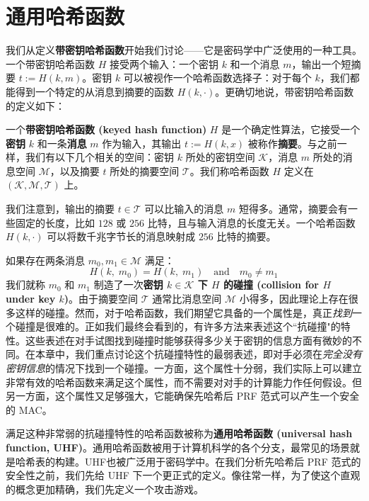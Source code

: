 \section{通用哈希函数}

我们从定义\textbf{带密钥哈希函数}开始我们讨论——它是密码学中广泛使用的一种工具。一个带密钥哈希函数 $H$ 接受两个输入：一个密钥 $k$ 和一个消息 $m$，输出一个短摘要 $t:=H(k,m)$。密钥 $k$ 可以被视作一个哈希函数选择子：对于每个 $k$，我们都能得到一个特定的从消息到摘要的函数 $H(k,\cdot)$。更确切地说，带密钥哈希函数的定义如下：

\begin{definition}[带密钥哈希函数]
一个\textbf{带密钥哈希函数 (keyed hash function)} $H$ 是一个确定性算法，它接受一个\textbf{密钥} $k$ 和一条\textbf{消息} $m$ 作为输入，其输出 $t:=H(k,x)$ 被称作\textbf{摘要}。与之前一样，我们有以下几个相关的空间：密钥 $k$ 所处的密钥空间 $\mathcal{K}$，消息 $m$ 所处的消息空间 $\mathcal{M}$，以及摘要 $t$ 所处的摘要空间 $\mathcal{T}$。我们称哈希函数 $H$ 定义在 $(\mathcal{K},\mathcal{M},\mathcal{T})$ 上。
\end{definition}

我们注意到，输出的摘要 $t\in\mathcal{T}$ 可以比输入的消息 $m$ 短得多。通常，摘要会有一些固定的长度，比如 $128$ 或 $256$ 比特，且与输入消息的长度无关。一个哈希函数 $H(k,\cdot)$ 可以将数千兆字节长的消息映射成 $256$ 比特的摘要。

如果存在两条消息 $m_0,m_1\in\mathcal{M}$ 满足：
\[
H(k,\;m_0)=H(k,\;m_1)
\quad\text{and}\quad
m_0\neq m_1
\]
我们就称 $m_0$ 和 $m_1$ 制造了一次\textbf{密钥 $k\in\mathcal{K}$ 下 $H$ 的碰撞 (collision for $H$ under key $k$)}。由于摘要空间 $\mathcal{T}$ 通常比消息空间 $\mathcal{M}$ 小得多，因此理论上存在很多这样的碰撞。然而，对于哈希函数，我们期望它具备的一个属性是，真正\emph{找到}一个碰撞是很难的。正如我们最终会看到的，有许多方法来表述这个``抗碰撞"的特性。这些表述在对手试图找到碰撞时能够获得多少关于密钥的信息方面有微妙的不同。在本章中，我们重点讨论这个抗碰撞特性的最弱表述，即对手必须在\emph{完全没有密钥信息}的情况下找到一个碰撞。一方面，这个属性十分弱，我们实际上可以建立非常有效的哈希函数来满足这个属性，而不需要对对手的计算能力作任何假设。但另一方面，这个属性又足够强大，它能确保先哈希后 PRF 范式可以产生一个安全的 MAC。

满足这种非常弱的抗碰撞特性的哈希函数被称为\textbf{通用哈希函数 (universal hash function, UHF)}。通用哈希函数被用于计算机科学的各个分支，最常见的场景就是哈希表的构建。UHF也被广泛用于密码学中。在我们分析先哈希后 PRF 范式的安全性之前，我们先给 UHF 下一个更正式的定义。像往常一样，为了使这个直观的概念更加精确，我们先定义一个攻击游戏。

